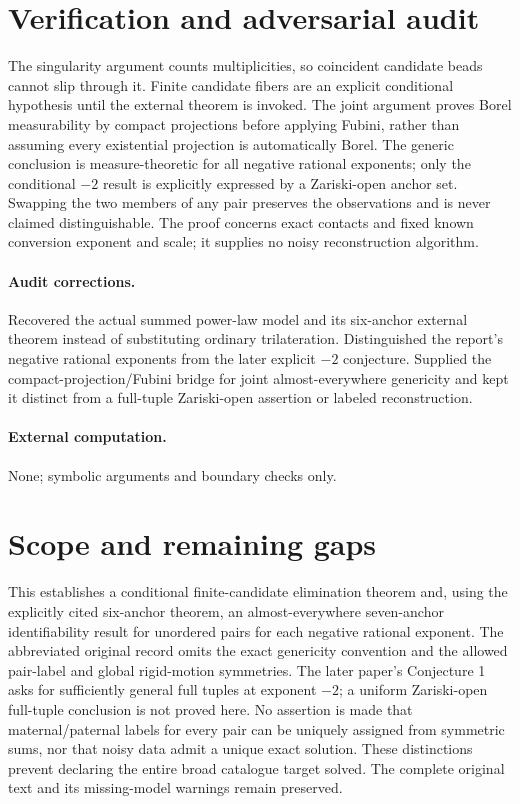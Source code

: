 \documentclass[11pt]{article}
\begin{document}
\section{Verification and adversarial audit}

The singularity argument counts multiplicities, so coincident candidate beads
cannot slip through it. Finite candidate fibers are an explicit conditional
hypothesis until the external theorem is invoked. The joint argument proves
Borel measurability by compact projections before applying Fubini, rather than
assuming every existential projection is automatically Borel. The generic
conclusion is measure-theoretic for all negative rational exponents; only the
conditional $-2$ result is explicitly expressed by a Zariski-open anchor set.
Swapping the two members of any pair preserves the observations and is never
claimed distinguishable. The proof concerns exact contacts and fixed known
conversion exponent and scale; it supplies no noisy reconstruction algorithm.

\paragraph{Audit corrections.} Recovered the actual summed power-law model and its six-anchor external
theorem instead of substituting ordinary trilateration. Distinguished the report's
negative rational exponents from the later explicit $-2$ conjecture. Supplied the
compact-projection/Fubini bridge for joint almost-everywhere genericity and kept
it distinct from a full-tuple Zariski-open assertion or labeled reconstruction.
\paragraph{External computation.} None; symbolic arguments and boundary checks only.
\section{Scope and remaining gaps}

This establishes a conditional finite-candidate elimination theorem and, using
the explicitly cited six-anchor theorem, an almost-everywhere seven-anchor
identifiability result for unordered pairs for each negative rational exponent.
The abbreviated original record omits the exact genericity convention and the
allowed pair-label and global rigid-motion symmetries. The later paper's
Conjecture 1 asks for sufficiently general full tuples at exponent $-2$;
a uniform Zariski-open full-tuple conclusion is not proved here.
No assertion is made that maternal/paternal labels for every pair can be uniquely
assigned from symmetric sums, nor that noisy data admit a unique exact solution.
These distinctions prevent declaring the entire broad catalogue target solved.
The complete original text and its missing-model warnings remain preserved.
\end{document}
